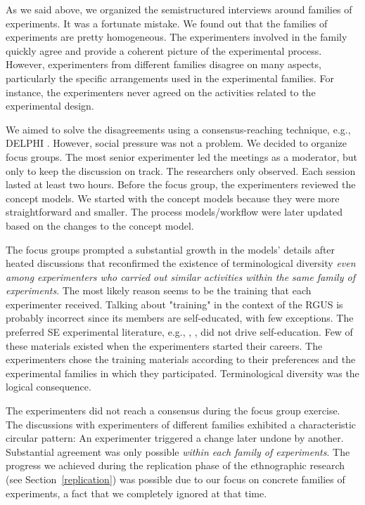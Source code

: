 As we said above, we organized the semistructured interviews around families of experiments. It was a fortunate mistake. We found out that the families of experiments are pretty homogeneous. The experimenters involved in the family quickly agree and provide a coherent picture of the experimental process. However, experimenters from different families disagree on many aspects, particularly the specific arrangements used in the experimental families. For instance, the experimenters never agreed on the activities related to the experimental design.

We aimed to solve the disagreements using a consensus-reaching technique, e.g., DELPHI \cite{Dalkey-1967-Delphi}. However, social pressure was not a problem. We decided to organize focus groups. The most senior experimenter led the meetings as a moderator, but only to keep the discussion on track. The researchers only observed. Each session lasted at least two hours. Before the focus group, the experimenters reviewed the concept models. We started with the concept models because they were more straightforward and smaller. The process models/workflow were later updated based on the changes to the concept model.

The focus groups prompted a substantial growth in the models' details after heated discussions that reconfirmed the existence of terminological diversity \textit{even among experimenters who carried out similar activities within the same family of experiments}. The most likely reason seems to be the training that each experimenter received. Talking about "training" in the context of the RGUS is probably incorrect since its members are self-educated, with few exceptions. The preferred SE experimental literature, e.g., \cite{Creswell-2009-Method-Approaches}, \cite{montgomery-2019-Design-Analysis-Experiments}, did not drive self-education. Few of these materials existed when the experimenters started their careers. The experimenters chose the training materials according to their preferences and the experimental families in which they participated. Terminological diversity was the logical consequence.

The experimenters did not reach a consensus during the focus group exercise. The discussions with experimenters of different families exhibited a characteristic circular pattern: An experimenter triggered a change later undone by another. Substantial agreement was only possible \textit{within each family of experiments}. The progress we achieved during the replication phase of the ethnographic research (see Section~\ref {replication}) was possible due to our focus on concrete families of experiments, a fact that we completely ignored at that time.

